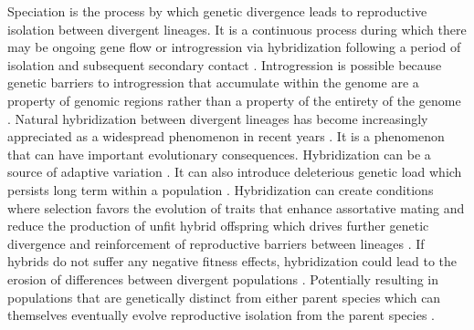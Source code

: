 

Speciation is the process by which genetic divergence leads to reproductive  
isolation between divergent lineages.
It is a continuous process during which there may be ongoing gene flow or 
introgression via hybridization following a period of isolation and subsequent
secondary contact \parencite{mallet2008,wu2001}.
Introgression is possible because genetic barriers to introgression that accumulate 
within the genome are a property of genomic regions rather than a property of the 
entirety of the genome \parencite{wu2001,gompert2012b}.
Natural hybridization between divergent lineages has become increasingly 
appreciated as a widespread phenomenon in recent years \parencite{mallet2005,moran2021}.
It is a phenomenon that can have important evolutionary consequences.
Hybridization can be a source of adaptive variation \parencite{hedrick2013}. 
It can also introduce deleterious genetic load which persists long term 
within a population \parencite{moran2021}. %
Hybridization can create conditions where selection favors the evolution of traits 
that enhance assortative mating and reduce the production of unfit hybrid offspring
which drives further genetic divergence and reinforcement of reproductive barriers
between lineages \parencite{servedio2003}.
If hybrids do not suffer any negative fitness effects, hybridization could lead to 
the erosion of differences between divergent populations \parencite{taylor2006}.
Potentially resulting in populations that are genetically distinct from either 
parent species which can themselves eventually evolve reproductive isolation from 
the parent species \parencite{moran2021}.


